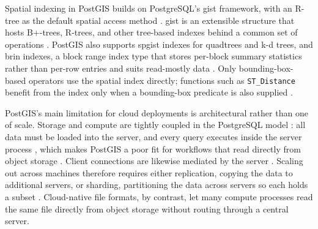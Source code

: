 Spatial indexing in PostGIS builds on PostgreSQL's \acrfull{gist} framework, with an R-tree as the default spatial access method \parencite{postgis2024_manual_34, hellerstein1995_generalized_search_trees_database_systems}. \acrshort{gist} is an extensible structure that hosts B+-trees, R-trees, and other tree-based indexes behind a common set of operations \parencite{hellerstein1995_generalized_search_trees_database_systems}. PostGIS also supports \acrfull{spgist} indexes for quadtrees and k-d trees, and \acrshort{brin} indexes, a block range index type that stores per-block summary statistics rather than per-row entries and suits read-mostly data \parencite{postgis2024_manual_34}. Only bounding-box-based operators use the spatial index directly; functions such as \texttt{ST\_Distance} benefit from the index only when a bounding-box predicate is also supplied \parencite{postgis2024_manual_34}.

PostGIS's main limitation for cloud deployments is architectural rather than one of scale. Storage and compute are tightly coupled in the PostgreSQL model \parencite{dageville2016_snowflake_elastic_data_warehouse}: all data must be loaded into the server, and every query executes inside the server process \parencite{postgresql2024_architectural_fundamentals}, which makes PostGIS a poor fit for workflows that read directly from object storage \parencite{pang2024_storage_disaggregated_databases}. Client connections are likewise mediated by the server \parencite{postgresql2024_architectural_fundamentals}. Scaling out across machines therefore requires either replication, copying the data to additional servers, or sharding, partitioning the data across servers so each holds a subset \parencite{stonebraker1986_case_for_shared_nothing}. Cloud-native file formats, by contrast, let many compute processes read the same file directly from object storage without routing through a central server.


